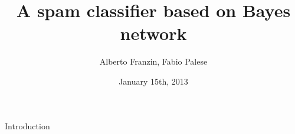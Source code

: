 \documentclass[xcolor=x11names,compress]{beamer}
\title{A spam classifier based on Bayes network}
\author{Alberto Franzin, Fabio Palese}
\date{January 15th, 2013}
\institute[2013]{Sistemi Intelligenti}
\renewcommand{\(}{\begin{columns}}
\renewcommand{\)}{\end{columns}}
\newcommand{\<}[1]{\begin{column}{#1}}
\renewcommand{\>}{\end{column}}
\begin{document}

\frame{\titlepage}


\begin{frame}{Introduction}
\tableofcontents
\end{frame}

\end{document}
